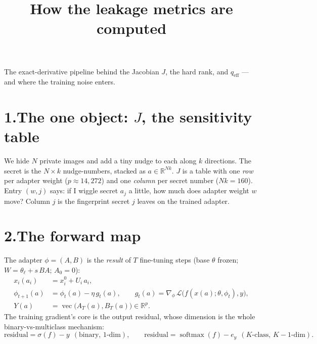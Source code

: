 \documentclass[11pt]{article}
\title{\textbf{How the leakage metrics are computed}}
\author{}\date{}
\newcommand{\R}{\mathbb{R}}
\begin{document}
\maketitle
\vspace{-3em}
\noindent The exact-derivative pipeline behind the Jacobian $J$, the hard rank, and $q_{\mathrm{eff}}$ ---
and where the training noise enters.

\section*{1.\quad The one object: $J$, the sensitivity table}
We hide $N$ private images and add a tiny nudge to each along $k$ directions. The secret is the
$N{\times}k$ nudge-numbers, stacked as $a\in\R^{Nk}$. $J$ is a table with one \emph{row} per adapter
weight ($p\approx 14{,}272$) and one \emph{column} per secret number ($Nk=160$). Entry $(w,j)$ says:
if I wiggle secret $a_j$ a little, how much does adapter weight $w$ move? Column $j$ is the fingerprint
secret $j$ leaves on the trained adapter.

\section*{2.\quad The forward map}
The adapter $\phi=(A,B)$ is the \emph{result} of $T$ fine-tuning steps (base $\theta$ frozen;
$W=\theta_\ell+s\,BA$; $A_0=0$):
\begin{align}
x_i(a_i) &= x_i^0 + U_i\,a_i, \\
\phi_{t+1}(a) &= \phi_t(a) - \eta\,g_t(a), \qquad g_t(a)=\nabla_\phi\,\mathcal L\big(f(x(a);\theta,\phi_t),y\big), \\
Y(a) &= \operatorname{vec}\big(A_T(a),B_T(a)\big)\in\R^{p}.
\end{align}
The training gradient's core is the output residual, whose dimension is the whole
binary-vs-multiclass mechanism:
\[
\text{residual}=\sigma(f)-y \ \ (\text{binary, }1\text{-dim}), \qquad
\text{residual}=\operatorname{softmax}(f)-e_y \ \ (K\text{-class, }K{-}1\text{-dim}).
\]
\end{document}
